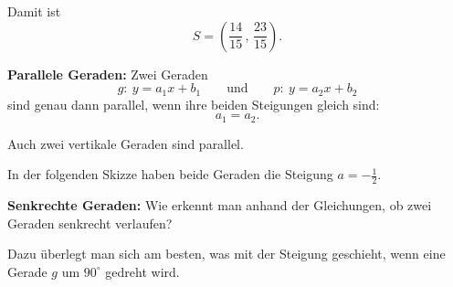 Damit ist
\[
    \boxed{S=\left(\frac{14}{15}\, , \,\frac{23}{15}\right)}.
\]


\textbf{Parallele Geraden:} Zwei Geraden
\[
    g:\ y=a_1x+b_1
    \qquad\text{und}\qquad
    p:\ y=a_2x+b_2
\]
sind genau dann parallel, wenn ihre beiden Steigungen gleich sind:
\[
    \boxed{a_1=a_2}.
\]

Auch zwei vertikale Geraden sind parallel.

In der folgenden Skizze haben beide Geraden die Steigung
\(a=-\frac12\).

\begin{center}
\end{center}


\textbf{Senkrechte Geraden:}
Wie erkennt man anhand der Gleichungen, ob zwei Geraden
senkrecht verlaufen?

Dazu überlegt man sich am besten, was mit der Steigung
geschieht, wenn eine Gerade \(g\) um \(90^\circ\) gedreht wird.

